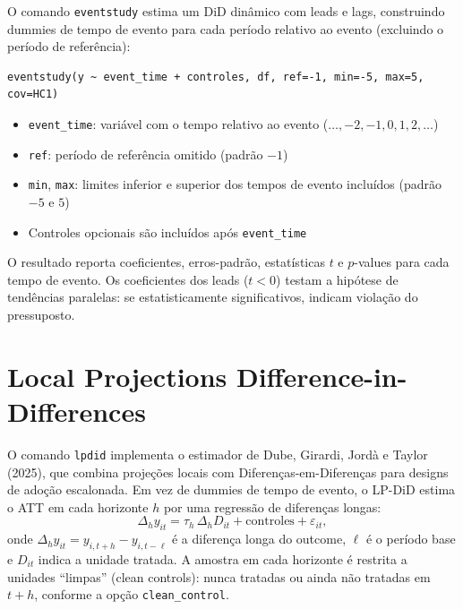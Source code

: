 O comando \texttt{eventstudy} estima um DiD dinâmico com leads e lags,
construindo dummies de tempo de evento para cada período relativo ao
evento (excluindo o período de referência):

\begin{lstlisting}
eventstudy(y ~ event_time + controles, df, ref=-1, min=-5, max=5, cov=HC1)
\end{lstlisting}

\begin{itemize}
  \item \texttt{event\_time}: variável com o tempo relativo ao evento
    ($\ldots, -2, -1, 0, 1, 2, \ldots$)
  \item \texttt{ref}: período de referência omitido (padrão $-1$)
  \item \texttt{min}, \texttt{max}: limites inferior e superior dos
    tempos de evento incluídos (padrão $-5$ e $5$)
  \item Controles opcionais são incluídos após \texttt{event\_time}
\end{itemize}

O resultado reporta coeficientes, erros-padrão, estatísticas $t$ e
$p$-values para cada tempo de evento. Os coeficientes dos leads
($t < 0$) testam a hipótese de tendências paralelas: se
estatisticamente significativos, indicam violação do pressuposto.

\section{Local Projections Difference-in-Differences}
\label{sec:lpdid}


O comando \texttt{lpdid} implementa o estimador de
Dube, Girardi, Jordà e Taylor (2025), que combina projeções locais com
Diferenças-em-Diferenças para designs de adoção escalonada. Em vez
de dummies de tempo de evento, o LP-DiD estima o ATT em cada horizonte
$h$ por uma regressão de diferenças longas:
\[
  \Delta_h y_{it} = \tau_h \, \Delta_h D_{it} + \text{controles} + \varepsilon_{it},
\]
onde $\Delta_h y_{it} = y_{i,t+h} - y_{i,t-\ell}$ é a diferença
longa do outcome, $\ell$ é o período base e $D_{it}$ indica a
unidade tratada. A amostra em cada horizonte é restrita a unidades
``limpas'' (clean controls): nunca tratadas ou ainda não tratadas em
$t+h$, conforme a opção \texttt{clean\_control}.

